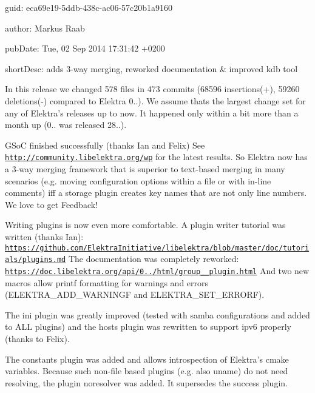 
\begin{DoxyItemize}
\item guid\+: eca69e19-\/5ddb-\/438c-\/ac06-\/57c20b1a9160
\item author\+: Markus Raab
\item pub\+Date\+: Tue, 02 Sep 2014 17\+:31\+:42 +0200
\item short\+Desc\+: adds 3-\/way merging, reworked documentation \& improved kdb tool
\end{DoxyItemize}

In this release we changed 578 files in 473 commits (68596 insertions(+), 59260 deletions(-\/) compared to Elektra 0..). We assume thats the largest change set for any of Elektra’s releases up to now. It happened only within a bit more than a month up (0.. was released 28..).

G\+SoC finished successfully (thanks Ian and Felix) See \href{http://community.libelektra.org/wp}{\tt http\+://community.\+libelektra.\+org/wp} for the latest results. So Elektra now has a 3-\/way merging framework that is superior to text-\/based merging in many scenarios (e.\+g. moving configuration options within a file or with in-\/line comments) iff a storage plugin creates key names that are not only line numbers. We love to get Feedback!

Writing plugins is now even more comfortable. A plugin writer tutorial was written (thanks Ian)\+: \href{https://github.com/ElektraInitiative/libelektra/blob/master/doc/tutorials/plugins.md}{\tt https\+://github.\+com/\+Elektra\+Initiative/libelektra/blob/master/doc/tutorials/plugins.\+md} The documentation was completely reworked\+: \href{https://doc.libelektra.org/api/0.8.7/html/group__plugin.html}{\tt https\+://doc.\+libelektra.\+org/api/0../html/group\+\_\+\+\_\+plugin.\+html} And two new macros allow printf formatting for warnings and errors ({\ttfamily E\+L\+E\+K\+T\+R\+A\+\_\+\+A\+D\+D\+\_\+\+W\+A\+R\+N\+I\+N\+GF} and {\ttfamily E\+L\+E\+K\+T\+R\+A\+\_\+\+S\+E\+T\+\_\+\+E\+R\+R\+O\+RF}).

The ini plugin was greatly improved (tested with samba configurations and added to A\+LL plugins) and the hosts plugin was rewritten to support ipv6 properly (thanks to Felix).

The constants plugin was added and allows introspection of Elektra’s cmake variables. Because such non-\/file based plugins (e.\+g. also uname) do not need resolving, the plugin noresolver was added. It supersedes the success plugin.


